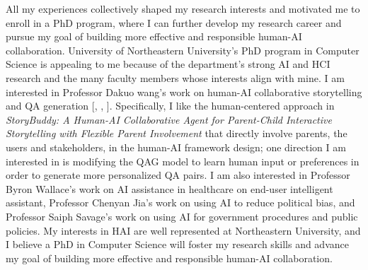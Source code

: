 

All my experiences collectively shaped my research interests and motivated me to enroll in a PhD program, where I can further develop my research career and pursue my goal of building more effective and responsible human-AI collaboration. 
University of Northeastern University's PhD program in Computer Science is appealing to me because of the department's strong AI and HCI research and the many faculty members whose interests align with mine. 
I am interested in Professor Dakuo wang's work on human-AI collaborative storytelling and QA generation [, , ]. Specifically, I like the human-centered approach in \textit{StoryBuddy: A Human-AI Collaborative Agent for Parent-Child Interactive Storytelling with Flexible Parent Involvement} that directly involve parents, the users and stakeholders, in the human-AI framework design; one direction I am interested in is modifying the QAG model to learn human input or preferences in order to generate more personalized QA pairs.
I am also interested in Professor Byron Wallace's work on AI assistance in healthcare on end-user intelligent assistant, Professor Chenyan Jia's work on using AI to reduce political bias, and Professor Saiph Savage's work on using AI for government procedures and public policies.
My interests in HAI are well represented at Northeastern University, and I believe a PhD in Computer Science will foster my research skills and advance my goal of building more effective and responsible human-AI collaboration.
